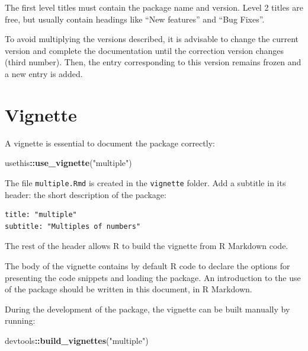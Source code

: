 \documentclass[
  12pt,
  american,
  a4paper,
  extrafontsizes,onecolumn,openright
  ]{memoir}
\newenvironment{Shaded}{\begin{snugshade}}{\end{snugshade}}
\newcommand{\FunctionTok}[1]{\textcolor[rgb]{0.13,0.29,0.53}{\textbf{#1}}}
\newcommand{\NormalTok}[1]{#1}
\newcommand{\SpecialCharTok}[1]{\textcolor[rgb]{0.81,0.36,0.00}{\textbf{#1}}}
\newcommand{\StringTok}[1]{\textcolor[rgb]{0.31,0.60,0.02}{#1}}
\begin{document}
The first level titles must contain the package name and version.
Level 2 titles are free, but usually contain headings like \enquote{New features} and \enquote{Bug Fixes}.

To avoid multiplying the versions described, it is advisable to change the current version and complete the documentation until the correction version changes (third number).
Then, the entry corresponding to this version remains frozen and a new entry is added.

\section{Vignette}\label{vignette}

A vignette is essential to document the package correctly:

\scriptsize

\begin{Shaded}
\begin{Highlighting}[]
\NormalTok{usethis}\SpecialCharTok{::}\FunctionTok{use\_vignette}\NormalTok{(}\StringTok{"multiple"}\NormalTok{)}
\end{Highlighting}
\end{Shaded}

\normalsize

The file \texttt{multiple.Rmd} is created in the \texttt{vignette} folder.
Add a subtitle in its header: the short description of the package:

\begin{verbatim}
title: "multiple"
subtitle: "Multiples of numbers"
\end{verbatim}

The rest of the header allows R to build the vignette from R Markdown code.

The body of the vignette contains by default R code to declare the options for presenting the code snippets and loading the package.
An introduction to the use of the package should be written in this document, in R Markdown.

During the development of the package, the vignette can be built manually by running:

\scriptsize

\begin{Shaded}
\begin{Highlighting}[]
\NormalTok{devtools}\SpecialCharTok{::}\FunctionTok{build\_vignettes}\NormalTok{(}\StringTok{"multiple"}\NormalTok{)}
\end{Highlighting}
\end{Shaded}
\end{document}
